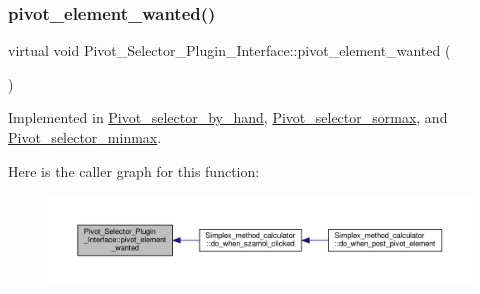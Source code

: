 \mbox{\label{classPivot__Selector__Plugin__Interface_a79edca6930746a137a95a26239f7af5e}} 
\subsubsection{\texorpdfstring{pivot\+\_\+element\+\_\+wanted()}{pivot\_element\_wanted()}\hspace{0.1cm}{\footnotesize\ttfamily [2/4]}}
{\footnotesize\ttfamily virtual void Pivot\+\_\+\+Selector\+\_\+\+Plugin\+\_\+\+Interface\+::pivot\+\_\+element\+\_\+wanted (\begin{DoxyParamCaption}\item[{Q\+Standard\+Item\+Model $\ast$}]{ }\end{DoxyParamCaption})\hspace{0.3cm}{\ttfamily [pure virtual]}}



Implemented in \hyperlink{classPivot__selector__by__hand_adbb9dac36bf6cc6807433c617c19ad32}{Pivot\+\_\+selector\+\_\+by\+\_\+hand}, \hyperlink{classPivot__selector__sormax_acfb3f057c0d2dd29b33ef23d547dfe36}{Pivot\+\_\+selector\+\_\+sormax}, and \hyperlink{classPivot__selector__minmax_ae47a96737d527fa40d1ee6608caf9bf3}{Pivot\+\_\+selector\+\_\+minmax}.

Here is the caller graph for this function\+:\nopagebreak
\begin{figure}[H]
\begin{center}
\leavevmode
\includegraphics[width=350pt]{classPivot__Selector__Plugin__Interface_a79edca6930746a137a95a26239f7af5e_icgraph}
\end{center}
\end{figure}
\mbox{\label{classPivot__Selector__Plugin__Interface_a79edca6930746a137a95a26239f7af5e}} 
